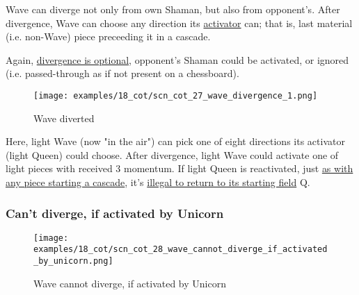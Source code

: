 \vspace*{-0.4\baselineskip}
Wave can diverge not only from own Shaman, but also from opponent's. After divergence,
Wave can choose any direction its
\hyperref[fig:scn_mv_27_wave_cascading_steps]{activator} can; that is, last material
(i.e. non-Wave) piece preceeding it in a cascade.

Again, \hyperref[fig:scn_cot_09_own_shaman_is_divergent_init]{divergence is optional},
opponent's Shaman could be activated, or ignored (i.e. passed-through as if not present
on a chessboard).

\clearpage %

\vspace*{-2.1\baselineskip}
\noindent
\begin{figure}[!h]
\texttt{[image: examples/18\_cot/scn\_cot\_27\_wave\_divergence\_1.png]}
\vspace*{-1.3\baselineskip}
\caption{Wave diverted}
\label{fig:scn_cot_27_wave_divergence_1}
\end{figure}

\vspace*{-0.4\baselineskip}
Here, light Wave (now "in the air") can pick one of eight directions its activator
(light Queen) could choose. After divergence, light Wave could activate one of light
pieces with received 3 momentum. If light Queen is reactivated, just
\hyperref[fig:scn_mv_43_static_move_is_illegal_init]{as with any piece starting a cascade}, it's
\hyperref[fig:scn_cot_10_own_shaman_is_divergent_end]{illegal to return to its starting field} Q.

\clearpage %

\subsubsection*{Can't diverge, if activated by Unicorn}
\label{sec:Conquest of Tlalocan/Divergence/Can't diverge, if activated by Unicorn}

\vspace*{-1.4\baselineskip}
\noindent
\begin{figure}[!h]
\texttt{[image: examples/18\_cot/scn\_cot\_28\_wave\_cannot\_diverge\_if\_activated\_by\_unicorn.png]}
\vspace*{-1.3\baselineskip}
\caption{Wave cannot diverge, if activated by Unicorn}
\label{fig:scn_cot_28_wave_cannot_diverge_if_activated_by_unicorn}
\end{figure}

